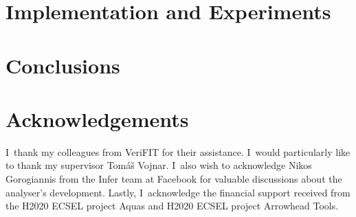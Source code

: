 \documentclass{ExcelAtFIT}
\theoremstyle{definition}
\begin{document}
\section{Implementation and Experiments}
\label{sec:exp}



\section{Conclusions}
\label{sec:conc}



\section*{Acknowledgements}
I~thank my colleagues from VeriFIT for their assistance. I~would particularly like to thank my supervisor Tomáš Vojnar. I~also wish to acknowledge Nikos Gorogiannis from the Infer team at Facebook for valuable discussions about the analyser’s development. Lastly, I~acknowledge the financial support received from the H2020 ECSEL project Aquas and H2020 ECSEL project Arrowhead Tools.






\end{document}
